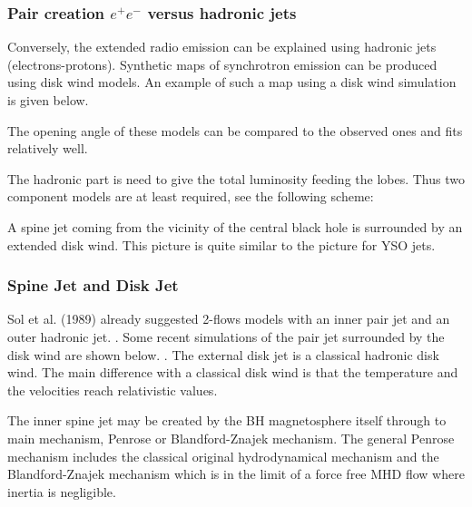 \documentclass[10pt,a4paper,english]{article}
\begin{document}
\subsubsection{\texorpdfstring{Pair creation $e^+ e^-$ versus hadronic
    jets}{Pair creation e⁺e⁻ versus hadronic jets}}
Conversely, the extended radio emission can be explained using
hadronic jets (electrons-protons). Synthetic maps of synchrotron
emission can be produced using disk wind models. An example of such a
map using a disk wind simulation is given below.  

The opening angle of these models can be compared to the observed ones
and fits relatively well. 

The hadronic part is need to give the total luminosity feeding the
lobes. Thus two component models are at least required, see the
following scheme: 

A spine jet coming from the vicinity of the central black hole is
surrounded by an extended disk wind. This picture is quite similar to
the picture for YSO jets.
\subsubsection{Spine Jet and Disk Jet}
Sol et al. (1989) already suggested 2-flows models with an inner pair
jet and an outer hadronic jet. . Some recent simulations of the pair jet surrounded
by the disk wind are shown below. . The external disk jet is a classical hadronic disk wind. The
main difference with a classical disk wind is that the temperature and
the velocities reach relativistic values.

The inner spine jet may be created by the BH magnetosphere itself
through to main mechanism, Penrose or Blandford-Znajek mechanism. The
general Penrose mechanism includes the classical original
hydrodynamical mechanism and the Blandford-Znajek mechanism which is
in the limit of a force free MHD flow where inertia is negligible.
\end{document}
